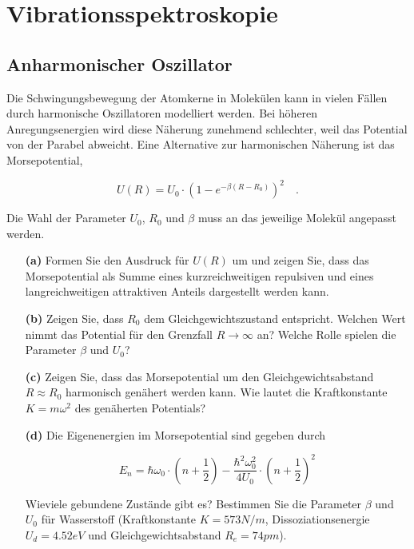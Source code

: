 \renewcommand{\lastmod}{\today}

\chapter{Vibrationsspektroskopie}



\section{Anharmonischer Oszillator}


Die Schwingungsbewegung der Atomkerne in Molekülen kann in vielen Fällen durch harmonische Oszillatoren modelliert werden. Bei höheren Anregungsenergien wird diese Näherung zunehmend schlechter, weil das Potential von der Parabel abweicht. Eine Alternative zur harmonischen Näherung ist das Morsepotential,

$$ U(R) = U_0 \cdot \left(1 - e^{- \beta (R - R_0)}\right)^2\quad. $$

Die Wahl der Parameter $U_0$, $R_0$ und $\beta$ muss an das jeweilige Molekül angepasst werden.


\begin{itemize}

	\item[\textbf{(a)}] Formen Sie den Ausdruck für $U(R)$ um und zeigen Sie, dass das Morsepotential als Summe eines kurzreichweitigen repulsiven und eines langreichweitigen attraktiven Anteils dargestellt werden kann.

	\item[\textbf{(b)}] Zeigen Sie, dass $R_0$ dem Gleichgewichtszustand entspricht. Welchen Wert nimmt das Potential für den Grenzfall $R \rightarrow \infty$ an? Welche Rolle spielen die Parameter $\beta$ und $U_0$?

	\item[\textbf{(c)}] Zeigen Sie, dass das Morsepotential um den Gleichgewichtsabstand $R \approx R_0$ harmonisch genähert werden kann. Wie lautet die Kraftkonstante $K = m\omega^2$ des genäherten Potentials? 
	
	\item[\textbf{(d)}] Die Eigenenergien im Morsepotential sind gegeben durch 
	
		$$ E_n = \hbar \omega_0 \cdot \left(n + \frac{1}{2}\right) - \frac{\hbar^2 \omega_0^2}{4 U_0} \cdot \left(n + \frac{1}{2}\right)^2 $$
		
		Wieviele gebundene Zustände gibt es? Bestimmen Sie die Parameter $\beta$ und $U_0$ für Wasserstoff (Kraftkonstante $K = 573 N/m$, Dissoziationsenergie $U_{d} = 4.52 eV$ und Gleichgewichtsabstand $R_e = 74 pm$).
	
\end{itemize}



